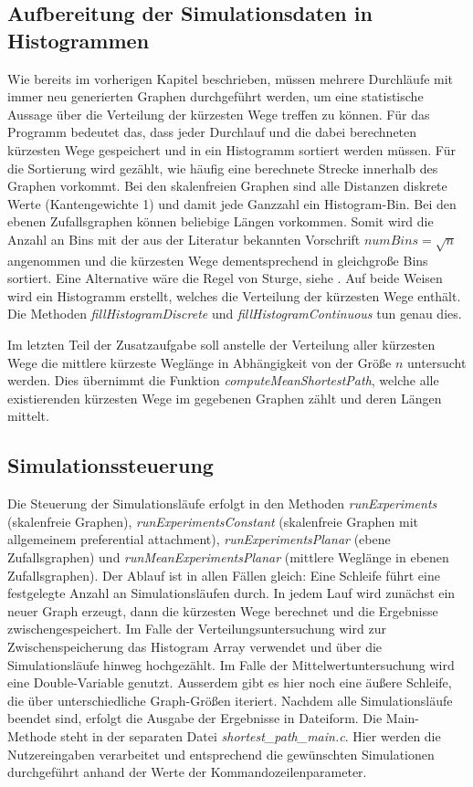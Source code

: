 \documentclass[10pt]{article}
\begin{document}
\subsection{Aufbereitung der Simulationsdaten in Histogrammen}
Wie bereits im vorherigen Kapitel beschrieben, müssen mehrere Durchläufe mit immer neu generierten Graphen durchgeführt werden, um eine statistische Aussage über die Verteilung der kürzesten Wege treffen zu können. Für das Programm bedeutet das, dass jeder Durchlauf und die dabei berechneten kürzesten Wege gespeichert und in ein Histogramm sortiert werden müssen. Für die Sortierung wird gezählt, wie häufig eine berechnete Strecke innerhalb des Graphen vorkommt. Bei den skalenfreien Graphen sind alle Distanzen diskrete Werte (Kantengewichte 1) und damit jede Ganzzahl ein Histogram-Bin. Bei den ebenen Zufallsgraphen können beliebige Längen vorkommen. Somit wird die Anzahl an Bins mit der aus der Literatur bekannten Vorschrift $numBins=\sqrt{n}$ angenommen und die kürzesten Wege dementsprechend in gleichgroße Bins sortiert. Eine Alternative wäre die Regel von Sturge, siehe \cite{Sturge}.
Auf beide Weisen wird ein Histogramm erstellt, welches die Verteilung der kürzesten Wege enthält. Die Methoden \textit{fillHistogramDiscrete} und \textit{fillHistogramContinuous} tun genau dies.

Im letzten Teil der Zusatzaufgabe soll anstelle der Verteilung aller kürzesten Wege die mittlere kürzeste Weglänge in Abhängigkeit von der Größe $n$ untersucht werden. Dies übernimmt die Funktion \textit{computeMeanShortestPath}, welche alle existierenden kürzesten Wege im gegebenen Graphen zählt und deren Längen mittelt.

\subsection{Simulationssteuerung}
Die Steuerung der Simulationsläufe erfolgt in den Methoden \textit{runExperiments} (skalenfreie Graphen), \textit{runExperimentsConstant} (skalenfreie Graphen mit allgemeinem preferential attachment), \textit{runExperimentsPlanar} (ebene Zufallsgraphen) und \textit{runMeanExperimentsPlanar} (mittlere Weglänge in ebenen Zufallsgraphen). Der Ablauf ist in allen Fällen gleich: Eine Schleife führt eine festgelegte Anzahl an Simulationsläufen durch. In jedem Lauf wird zunächst ein neuer Graph erzeugt, dann die kürzesten Wege berechnet und die Ergebnisse zwischengespeichert. Im Falle der Verteilungsuntersuchung wird zur Zwischenspeicherung das Histogram Array verwendet und über die Simulationsläufe hinweg hochgezählt. Im Falle der Mittelwertuntersuchung wird eine Double-Variable genutzt. Ausserdem gibt es hier noch eine äußere Schleife, die über unterschiedliche Graph-Größen iteriert. Nachdem alle Simulationsläufe beendet sind, erfolgt die Ausgabe der Ergebnisse in Dateiform. Die Main-Methode steht in der separaten Datei \textit{shortest\_path\_main.c}. Hier werden die Nutzereingaben verarbeitet und entsprechend die gewünschten Simulationen durchgeführt anhand der Werte der Kommandozeilenparameter.
\end{document}
